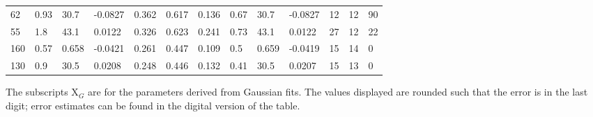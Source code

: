 \begin{table}[htp]
{\begin{tabular}{lllllllllllll}
62 & 0.93 & 30.7 & -0.0827 & 0.362 & 0.617 & 0.136 & 0.67 & 30.7 & -0.0827 & 12 & 12 & 90 \\
55 & 1.8 & 43.1 & 0.0122 & 0.326 & 0.623 & 0.241 & 0.73 & 43.1 & 0.0122 & 27 & 12 & 22 \\
160 & 0.57 & 0.658 & -0.0421 & 0.261 & 0.447 & 0.109 & 0.5 & 0.659 & -0.0419 & 15 & 14 & 0 \\
130 & 0.9 & 30.5 & 0.0208 & 0.248 & 0.446 & 0.132 & 0.41 & 30.5 & 0.0207 & 15 & 13 & 0 \\
\hline
\end{tabular}
}\par
The subscripts X${_G}$ are for the parameters derived from Gaussian fits.  The values displayed are rounded such that the error is in the last digit; error estimates can be found in the digital version of the table.
\end{table}
